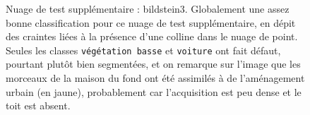 \documentclass[a4paper, onecolumn, 11pt]{article}
\begin{document}
\begin{figure}[h]
    \caption{Nuage de test supplémentaire : bildstein3. Globalement une assez bonne classification pour ce nuage de test supplémentaire, en dépit des craintes liées à la présence d'une colline dans le nuage de point. Seules les classes \texttt{végétation basse} et \texttt{voiture} ont fait défaut, pourtant plutôt bien segmentées, et on remarque sur l'image que les morceaux de la maison du fond ont été assimilés à de l'aménagement urbain (en jaune), probablement car l'acquisition est peu dense et le toit est absent.}
    \label{fig:bildstein3}
\end{figure}

\begin{figure}[h]
    \centering
    \qquad
    \qquad

\end{figure}
\end{document}
